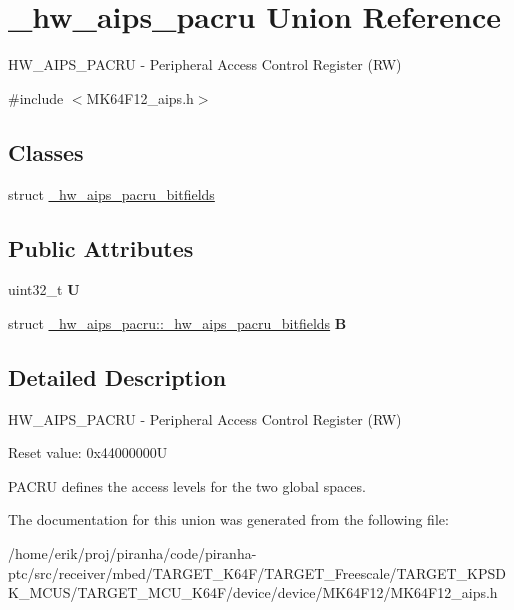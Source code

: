\hypertarget{union__hw__aips__pacru}{}\section{\+\_\+hw\+\_\+aips\+\_\+pacru Union Reference}
\label{union__hw__aips__pacru}


H\+W\+\_\+\+A\+I\+P\+S\+\_\+\+P\+A\+C\+RU -\/ Peripheral Access Control Register (RW)  




{\ttfamily \#include $<$M\+K64\+F12\+\_\+aips.\+h$>$}

\subsection*{Classes}
\begin{DoxyCompactItemize}
\item 
struct \hyperlink{struct__hw__aips__pacru_1_1__hw__aips__pacru__bitfields}{\+\_\+hw\+\_\+aips\+\_\+pacru\+\_\+bitfields}
\end{DoxyCompactItemize}
\subsection*{Public Attributes}
\begin{DoxyCompactItemize}
\item 
uint32\+\_\+t {\bfseries U}\hypertarget{union__hw__aips__pacru_a53be01ba538d12557f31f87d198a805d}{}\label{union__hw__aips__pacru_a53be01ba538d12557f31f87d198a805d}

\item 
struct \hyperlink{struct__hw__aips__pacru_1_1__hw__aips__pacru__bitfields}{\+\_\+hw\+\_\+aips\+\_\+pacru\+::\+\_\+hw\+\_\+aips\+\_\+pacru\+\_\+bitfields} {\bfseries B}\hypertarget{union__hw__aips__pacru_a9028aea171b06879897dab453c1783e9}{}\label{union__hw__aips__pacru_a9028aea171b06879897dab453c1783e9}

\end{DoxyCompactItemize}


\subsection{Detailed Description}
H\+W\+\_\+\+A\+I\+P\+S\+\_\+\+P\+A\+C\+RU -\/ Peripheral Access Control Register (RW) 

Reset value\+: 0x44000000U

P\+A\+C\+RU defines the access levels for the two global spaces. 

The documentation for this union was generated from the following file\+:\begin{DoxyCompactItemize}
\item 
/home/erik/proj/piranha/code/piranha-\/ptc/src/receiver/mbed/\+T\+A\+R\+G\+E\+T\+\_\+\+K64\+F/\+T\+A\+R\+G\+E\+T\+\_\+\+Freescale/\+T\+A\+R\+G\+E\+T\+\_\+\+K\+P\+S\+D\+K\+\_\+\+M\+C\+U\+S/\+T\+A\+R\+G\+E\+T\+\_\+\+M\+C\+U\+\_\+\+K64\+F/device/device/\+M\+K64\+F12/M\+K64\+F12\+\_\+aips.\+h\end{DoxyCompactItemize}
